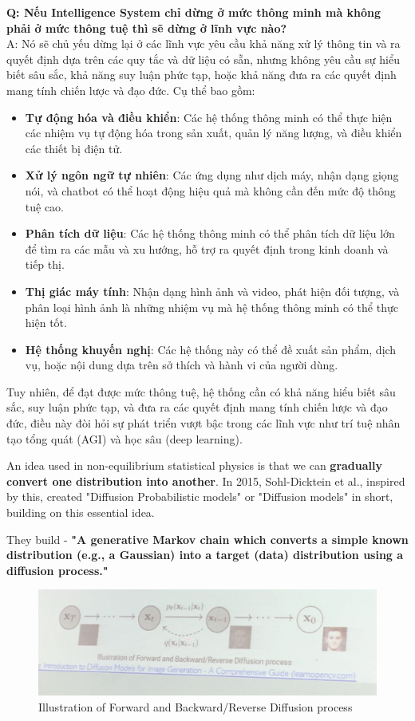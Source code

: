 \textbf{Q: Nếu Intelligence System chỉ dừng ở mức thông minh mà không phải ở mức thông tuệ thì sẽ dừng ở lĩnh vực nào?}\\
A: Nó sẽ chủ yếu dừng lại ở các lĩnh vực yêu cầu khả năng xử lý thông tin và ra quyết định dựa trên các quy tắc và dữ liệu có sẵn, nhưng không yêu cầu sự hiểu biết sâu sắc, khả năng suy luận phức tạp, hoặc khả năng đưa ra các quyết định mang tính chiến lược và đạo đức. Cụ thể bao gồm:
\begin{itemize}
    \item \textbf{Tự động hóa và điều khiển}: Các hệ thống thông minh có thể thực hiện các nhiệm vụ tự động hóa trong sản xuất, quản lý năng lượng, và điều khiển các thiết bị điện tử.
    \item \textbf{Xử lý ngôn ngữ tự nhiên}: Các ứng dụng như dịch máy, nhận dạng giọng nói, và chatbot có thể hoạt động hiệu quả mà không cần đến mức độ thông tuệ cao.
    \item \textbf{Phân tích dữ liệu}: Các hệ thống thông minh có thể phân tích dữ liệu lớn để tìm ra các mẫu và xu hướng, hỗ trợ ra quyết định trong kinh doanh và tiếp thị.
    \item \textbf{Thị giác máy tính}: Nhận dạng hình ảnh và video, phát hiện đối tượng, và phân loại hình ảnh là những nhiệm vụ mà hệ thống thông minh có thể thực hiện tốt.
    \item \textbf{Hệ thống khuyến nghị}: Các hệ thống này có thể đề xuất sản phẩm, dịch vụ, hoặc nội dung dựa trên sở thích và hành vi của người dùng.
\end{itemize}

Tuy nhiên, để đạt được mức thông tuệ, hệ thống cần có khả năng hiểu biết sâu sắc, suy luận phức tạp, và đưa ra các quyết định mang tính chiến lược và đạo đức, điều này đòi hỏi sự phát triển vượt bậc trong các lĩnh vực như trí tuệ nhân tạo tổng quát (AGI) và học sâu (deep learning).

An idea used in non-equilibrium statistical physics is that we can \textbf{gradually convert one distribution into another}. In 2015, Sohl-Dicktein et al., inspired by this, created "Diffusion Probabilistic models" or "Diffusion models" in short, building on this essential idea.

They build - \textbf{"A generative Markov chain which converts a simple known distribution (e.g., a Gaussian) into a target (data) distribution using a diffusion process."}

\begin{figure}[H]
    \centering
    \includegraphics[scale=.2]{img/ForwardNBackwardORReverse Diffusion process.jpg}
    \caption{Illustration of Forward and Backward/Reverse Diffusion process}
\end{figure}

